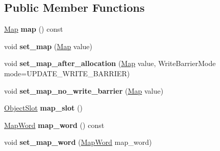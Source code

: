 \subsection*{Public Member Functions}
\begin{DoxyCompactItemize}
\item 
\mbox{\label{classv8_1_1internal_1_1HeapObjectPtr_aebd266886d68b75183930bae1d84fbef}} 
\mbox{\hyperlink{classv8_1_1internal_1_1Map}{Map}} {\bfseries map} () const
\item 
\mbox{\label{classv8_1_1internal_1_1HeapObjectPtr_a6cf3db6f027fef3ac5fb055295ffc688}} 
void {\bfseries set\+\_\+map} (\mbox{\hyperlink{classv8_1_1internal_1_1Map}{Map}} value)
\item 
\mbox{\label{classv8_1_1internal_1_1HeapObjectPtr_a4e61e61a62d94af25d23d25e6d0d8258}} 
void {\bfseries set\+\_\+map\+\_\+after\+\_\+allocation} (\mbox{\hyperlink{classv8_1_1internal_1_1Map}{Map}} value, Write\+Barrier\+Mode mode=U\+P\+D\+A\+T\+E\+\_\+\+W\+R\+I\+T\+E\+\_\+\+B\+A\+R\+R\+I\+ER)
\item 
\mbox{\label{classv8_1_1internal_1_1HeapObjectPtr_af5380e30fdd9ca5b9f991c9865b7184f}} 
void {\bfseries set\+\_\+map\+\_\+no\+\_\+write\+\_\+barrier} (\mbox{\hyperlink{classv8_1_1internal_1_1Map}{Map}} value)
\item 
\mbox{\label{classv8_1_1internal_1_1HeapObjectPtr_a9834e3029de158558d3f59fa74cc7a90}} 
\mbox{\hyperlink{classv8_1_1internal_1_1ObjectSlot}{Object\+Slot}} {\bfseries map\+\_\+slot} ()
\item 
\mbox{\label{classv8_1_1internal_1_1HeapObjectPtr_a989448f57a8cbd95974ee754bf2419d6}} 
\mbox{\hyperlink{classv8_1_1internal_1_1MapWord}{Map\+Word}} {\bfseries map\+\_\+word} () const
\item 
\mbox{\label{classv8_1_1internal_1_1HeapObjectPtr_a47f0cc8468828a61a9666172153b1b76}} 
void {\bfseries set\+\_\+map\+\_\+word} (\mbox{\hyperlink{classv8_1_1internal_1_1MapWord}{Map\+Word}} map\+\_\+word)
\item 

\end{DoxyCompactItemize}
